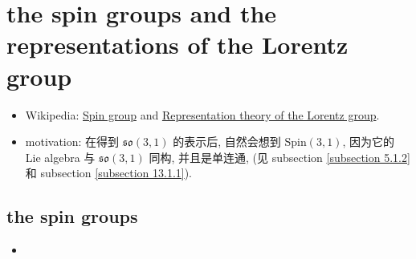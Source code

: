 \chapter{the spin groups and the representations of the Lorentz group}
\begin{itemize}
	\item Wikipedia: \href{https://en.wikipedia.org/wiki/Spin_group}{Spin group} and \href{https://en.wikipedia.org/wiki/Representation_theory_of_the_Lorentz_group}{Representation theory of the Lorentz group}.
	
	\item motivation: 在得到 $\mathfrak{so}(3, 1)$ 的表示后, 自然会想到 $\mathrm{Spin}(3, 1)$, 因为它的 Lie algebra 与 $\mathfrak{so}(3, 1)$ 同构, 并且是单连通, (见 subsection \ref{subsection 5.1.2} 和 subsection \ref{subsection 13.1.1}).
\end{itemize}

\section{the spin groups}
\begin{itemize}
	\item 
\end{itemize}
